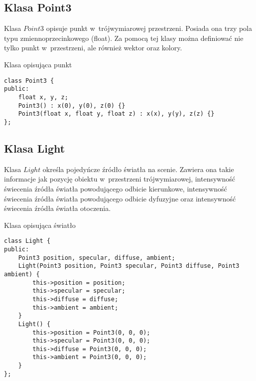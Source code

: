 \documentclass[11pt,a4paper,titlepage]{article}
\begin{document}
\subsection{Klasa Point3}
Klasa $Point3$ opisuje punkt w~trójwymiarowej przestrzeni. Posiada ona trzy pola typu zmiennoprzecinkowego (float). Za pomocą tej klasy można definiować nie tylko punkt w~przestrzeni, ale również wektor oraz kolory.
\begin{listing}[H]
\caption{Klasa opisująca punkt}
\begin{verbatim}
class Point3 {
public:
	float x, y, z;
	Point3() : x(0), y(0), z(0) {}
	Point3(float x, float y, float z) : x(x), y(y), z(z) {}
};
\end{verbatim}
\end{listing}

\subsection{Klasa Light}
Klasa $Light$ określa pojedyńcze źródło światła na scenie. Zawiera ona takie informacje jak pozycję obiektu w~przestrzeni trójwymiarowej, intensywność świecenia źródła światła powodującego odbicie kierunkowe, intensywność świecenia źródła światła powodującego odbicie dyfuzyjne oraz intensywność świecenia źródła światła otoczenia.
\begin{listing}[H]
\caption{Klasa opisująca światło}
\begin{verbatim}
class Light {
public:
	Point3 position, specular, diffuse, ambient;
	Light(Point3 position, Point3 specular, Point3 diffuse, Point3 ambient) {
		this->position = position;
		this->specular = specular;
		this->diffuse = diffuse;
		this->ambient = ambient;
	}
	Light() {
		this->position = Point3(0, 0, 0);
		this->specular = Point3(0, 0, 0);
		this->diffuse = Point3(0, 0, 0);
		this->ambient = Point3(0, 0, 0);
	}
};
\end{verbatim}
\end{listing}
\end{document}
